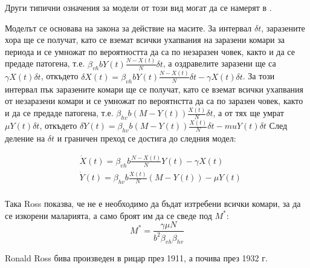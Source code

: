 \begin{remark}
Други типични означения за модели от този вид могат да се намерят в \cite{Smith2012}.
\end{remark}

Моделът се основава на закона за действие на масите.
За интервал $\delta t$, заразените хора ще се получат, като се вземат всички ухапвания на заразени комари за периода и се умножат по вероятността да са по незаразен човек, както и да се предаде патогена, т.е. $\beta_{vh} b Y(t) \frac{N-X(t)}{N} \delta t$, а оздравелите заразени ще са $\gamma X(t) \delta t$, откъдето $\delta X(t) = \beta_{vh} b Y(t) \frac{N-X(t)}{N} \delta t - \gamma X(t) \delta t$.
За този интервал пък заразените комари ще се получат, като се вземат всички ухапвания от незаразени комари и се умножат по вероятнстта да са по заразен човек, както и да се предаде патогена, т.е. $\beta_{hv} b (M - Y(t)) \frac{X(t)}{N} \delta t$, а от тях ще умрат $\mu Y(t) \delta t$, откъдето $\delta Y(t) = \beta_{hv} b (M - Y(t)) \frac{X(t)}{N} \delta t - mu Y(t) \delta t$ След деление на $\delta t$ и граничен преход се достига до следния модел:

\begin{equation}
  \label{eq:BasicProblem}
  \begin{split}
    &\dot{X}(t) = \beta_{vh} b \frac{N-X(t)}{N} Y(t) - \gamma X(t) \\
    &\dot{Y}(t) = \beta_{hv} b \frac{X(t)}{N} (M-Y(t)) - \mu Y(t) \\
  \end{split}
\end{equation}

Така Ross показва, че не е необходимо да бъдат изтребени всички комари, за да се изкорени маларията, а само броят им да се сведе под $M^*$:
\begin{equation}
  \label{eq:RossM}
  M^* = \frac{\gamma \mu N}{b^2 \beta_{vh} \beta_{hv}}
\end{equation}

Ronald Ross бива произведен в рицар през 1911, а почива през 1932 г.


